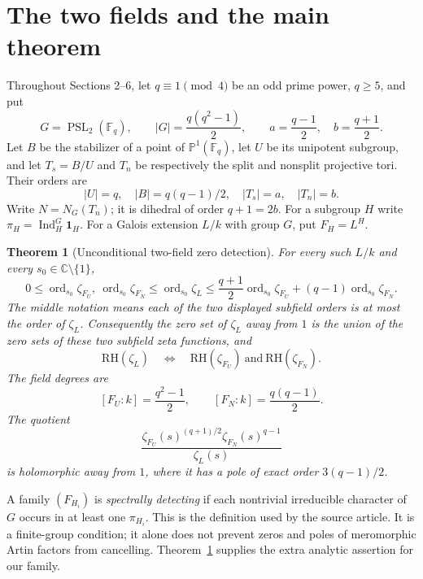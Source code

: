\documentclass[11pt]{article}
\newtheorem{theorem}{Theorem}[section]
\theoremstyle{remark}\newtheorem{remark}[theorem]{Remark}
\newcommand{\Ind}{\operatorname{Ind}}
\newcommand{\ord}{\operatorname{ord}}
\newcommand{\PSL}{\operatorname{PSL}}
\newcommand{\F}{\mathbb F}
\newcommand{\C}{\mathbb C}
\newcommand{\one}{\mathbf 1}
\newcommand{\RH}{\mathrm{RH}}
\begin{document}
\section{The two fields and the main theorem}
Throughout Sections 2--6, let $q\equiv1\pmod4$ be an odd prime power,
$q\ge5$, and put
\[
 G=\PSL_2(\F_q),\qquad |G|=\frac{q(q^2-1)}2,\qquad
 a=\frac{q-1}2,\quad b=\frac{q+1}2.
\]
Let $B$ be the stabilizer of a point of $\mathbb P^1(\F_q)$, let $U$ be
its unipotent subgroup, and let $T_s=B/U$ and $T_n$ be respectively the
split and nonsplit projective tori. Their orders are
\[
 |U|=q,\quad |B|=q(q-1)/2,\quad |T_s|=a,\quad |T_n|=b.
\]
Write $N=N_G(T_n)$; it is dihedral of order $q+1=2b$. For a subgroup $H$
write $\pi_H=\Ind_H^G\one_H$. For a Galois extension $L/k$ with group
$G$, put $F_H=L^H$.

\begin{theorem}[Unconditional two-field zero detection]\label{thm:analytic}
For every such $L/k$ and every $s_0\in\C\setminus\{1\}$,
\begin{equation}\label{eq:orders}
 0\le\ord_{s_0}\zeta_{F_U},\ \ord_{s_0}\zeta_{F_N}
 \le\ord_{s_0}\zeta_L
 \le \frac{q+1}2\ord_{s_0}\zeta_{F_U}
       +(q-1)\ord_{s_0}\zeta_{F_N}.
\end{equation}
The middle notation means each of the two displayed subfield orders is at
most the order of $\zeta_L$. Consequently the zero set of $\zeta_L$ away
from $1$ is the union of the zero sets of these two subfield zeta functions,
and
\[
 \RH(\zeta_L)\quad\Longleftrightarrow\quad
 \RH(\zeta_{F_U})\ \text{and}\ \RH(\zeta_{F_N}).
\]
The field degrees are
\[
 [F_U:k]=\frac{q^2-1}2,\qquad [F_N:k]=\frac{q(q-1)}2.
\]
The quotient
\begin{equation}\label{eq:quotient}
 \frac{\zeta_{F_U}(s)^{(q+1)/2}\zeta_{F_N}(s)^{q-1}}{\zeta_L(s)}
\end{equation}
is holomorphic away from $1$, where it has a pole of exact order
$3(q-1)/2$.
\end{theorem}

A family $(F_{H_i})$ is \emph{spectrally detecting} if each nontrivial
irreducible character of $G$ occurs in at least one $\pi_{H_i}$.
This is the definition used by the source article. It is a finite-group
condition; it alone does not prevent zeros and poles of meromorphic Artin
factors from cancelling. Theorem~\ref{thm:analytic} supplies the extra
analytic assertion for our family.
\end{document}

